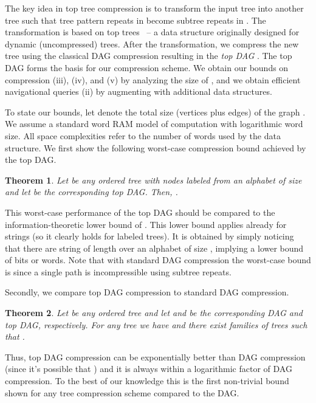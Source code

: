 \documentclass [11pt]{article}
\newtheorem{theorem}{Theorem}
\begin{document}
The key idea in top tree compression is to transform the input tree  into another tree  such that tree pattern repeats in  become subtree repeats in . The transformation is based on  top trees~\cite{AHLT1997,AHT2000,TopTrees} -- a data structure originally designed for dynamic (uncompressed) trees. After the transformation, we compress the new tree  using the classical DAG compression resulting in the \emph{top DAG} . The top DAG  forms the basis for our compression scheme. We obtain our bounds on compression (iii), (iv), and (v) by analyzing the size of  , and we obtain efficient navigational queries (ii) by augmenting  with additional data structures.


To state our bounds, let  denote the total size (vertices plus edges) of the graph . 
We assume a standard word RAM model of computation with logarithmic word size. All space complexities refer to the number of words used by the data structure. 
We first show the following worst-case compression bound achieved by the top DAG.

\begin{theorem}\label{thm:worstcasebounds}
Let  be any ordered tree with nodes labeled from an alphabet of size  and let  be the corresponding top DAG. Then, .
\end{theorem}
This worst-case performance of the top DAG should be compared to the information-theoretic lower bound of . This lower bound applies already for strings (so it clearly holds for labeled trees). It is obtained by simply noticing that there are  string of length  over an alphabet of size , implying a lower bound of   bits or  words. Note that with standard DAG compression the worst-case bound is  since a single path is incompressible using subtree repeats. 


Secondly, we compare top DAG compression to standard DAG compression. 
\begin{theorem}\label{thm:comparison}
Let  be any ordered tree and let  and  be the corresponding DAG and top DAG, respectively. For any tree  we have   and there exist families of trees  such that .
\end{theorem}
Thus, top DAG compression can be exponentially better than DAG compression (since it's possible that ) and it is always within a logarithmic factor of DAG compression.  
To the best of our knowledge this is the first non-trivial bound shown for any tree compression scheme compared to the DAG. 


  
\end{document}
